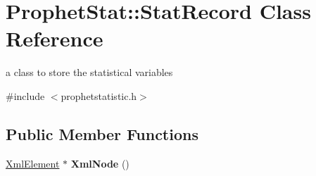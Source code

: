 \hypertarget{classProphetStat_1_1StatRecord}{
\section{ProphetStat::StatRecord Class Reference}
\label{classProphetStat_1_1StatRecord}
}


a class to store the statistical variables  




{\ttfamily \#include $<$prophetstatistic.h$>$}

\subsection*{Public Member Functions}
\begin{DoxyCompactItemize}
\item 
\hypertarget{classProphetStat_1_1StatRecord_a416ba4e0c158e1b767d8aa2ed9e641f7}{
\hyperlink{classXmlElement}{XmlElement} $\ast$ {\bfseries XmlNode} ()}
\label{classProphetStat_1_1StatRecord_a416ba4e0c158e1b767d8aa2ed9e641f7}

\end{DoxyCompactItemize}
